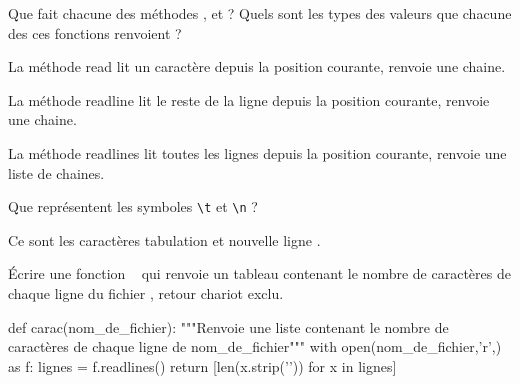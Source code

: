 \question{} Que fait chacune des méthodes  ,  et  ? Quels sont les types des valeurs que chacune des ces fonctions renvoient ? 

La méthode read lit un caractère depuis la position courante, renvoie une chaine.

La méthode readline lit le reste de la ligne depuis la position courante, renvoie une chaine.

La méthode readlines lit toutes les lignes depuis la position courante, renvoie une liste de chaines.

\question{} Que représentent les symboles \texttt{\textbackslash t} et \texttt{\textbackslash n} ?

Ce sont les caractères \og tabulation\fg{} et \og nouvelle ligne\fg{} .


\question{} \'Ecrire une fonction \python\  qui renvoie un tableau contenant le nombre de caractères de chaque ligne du fichier , retour chariot exclu. 

\begin{pyverbatim}
def carac(nom_de_fichier):
    """Renvoie une liste contenant le nombre de caractères 
       de chaque ligne de nom_de_fichier"""
    with open(nom_de_fichier,'r',) as f:
        lignes = f.readlines()
    return [len(x.strip('\n')) for x in lignes]
\end{pyverbatim}
